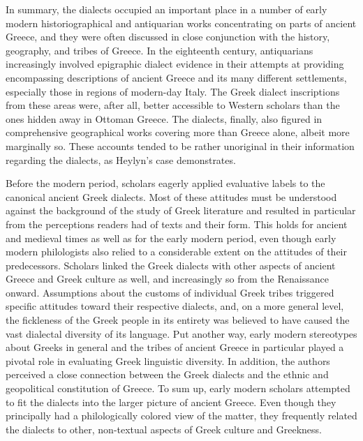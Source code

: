 \documentclass[12pt]{article}
\makeatletter
\renewcommand\subsection{\@startsection{subsection}{2}{0.1972in}{0.1665in}{0.0835in}{\normalfont\normalsize\fontsize{12pt}{14.4pt}\selectfont\rmfamily\bfseries}}
\newenvironment{styleStandard}{\renewcommand\baselinestretch{1.25}\setlength\leftskip{0in}\setlength\rightskip{0in}\setlength\parindent{0.1972in}\setlength\parfillskip{0pt plus 1fil}\setlength\parskip{0in plus 1pt}\writerlistparindent\writerlistleftskip\leavevmode\normalfont\normalsize\writerlistlabel\ignorespaces}{\unskip\vspace{0in plus 1pt}\par}
\newcommand\writerlistleftskip{}
\newcommand\writerlistparindent{}
\newcommand\writerlistlabel{}
\makeatother
\begin{document}
\begin{styleStandard}
In summary, the dialects occupied an important place in a number of early modern historiographical and antiquarian works concentrating on parts of ancient Greece, and they were often discussed in close conjunction with the history, geography, and tribes of Greece. In the eighteenth century, antiquarians increasingly involved epigraphic dialect evidence in their attempts at providing encompassing descriptions of ancient Greece and its many different settlements, especially those in regions of modern-day Italy. The Greek dialect inscriptions from these areas were, after all, better accessible to Western scholars than the ones hidden away in Ottoman Greece. The dialects, finally, also figured in comprehensive geographical works covering more than Greece alone, albeit more marginally so. These accounts tended to be rather unoriginal in their information regarding the dialects, as Heylyn’s case demonstrates.
\end{styleStandard}

\subsection{Conclusion}
\hypertarget{Toc19704856}{}\begin{styleStandard}
Before the modern period, scholars eagerly applied evaluative labels to the canonical ancient Greek dialects. Most of these attitudes must be understood against the background of the study of Greek literature and resulted in particular from the perceptions readers had of texts and their form. This holds for ancient and medieval times as well as for the early modern period, even though early modern philologists also relied to a considerable extent on the attitudes of their predecessors. Scholars linked the Greek dialects with other aspects of ancient Greece and Greek culture as well, and increasingly so from the Renaissance onward. Assumptions about the customs of individual Greek tribes triggered specific attitudes toward their respective dialects, and, on a more general level, the fickleness of the Greek people in its entirety was believed to have caused the vast dialectal diversity of its language. Put another way, early modern stereotypes about Greeks in general and the tribes of ancient Greece in particular played a pivotal role in evaluating Greek linguistic diversity. In addition, the authors perceived a close connection between the Greek dialects and the ethnic and geopolitical constitution of Greece. To sum up, early modern scholars attempted to fit the dialects into the larger picture of ancient Greece. Even though they principally had a philologically colored view of the matter, they frequently related the dialects to other, non-textual aspects of Greek culture and Greekness.
\end{styleStandard}
\end{document}
